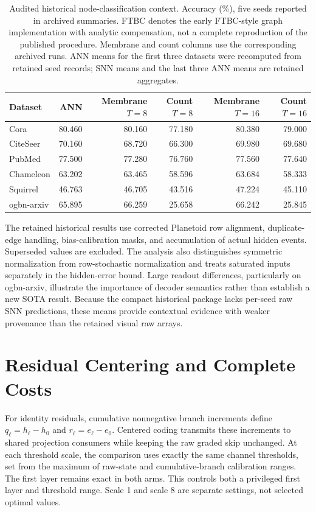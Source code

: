 \documentclass[10pt,twocolumn,letterpaper]{article}
\begin{document}
\begin{table}[t]\centering\small
\caption{Audited historical node-classification context. Accuracy (\%), five seeds reported in archived summaries. FTBC denotes the early FTBC-style graph implementation with analytic compensation, not a complete reproduction of the published procedure. Membrane and count columns use the corresponding archived runs. ANN means for the first three datasets were recomputed from retained seed records; SNN means and the last three ANN means are retained aggregates.}
\label{tab:nodes}
\begin{tabular}{lrrrrr}\toprule
Dataset & ANN & Membrane $T=8$ & Count $T=8$ & Membrane $T=16$ & Count $T=16$\\\midrule
Cora &80.460&80.160&77.180&80.380&79.000\\
CiteSeer &70.160&68.720&66.300&69.980&69.680\\
PubMed &77.500&77.280&76.760&77.560&77.640\\
Chameleon &63.202&63.465&58.596&63.684&58.333\\
Squirrel &46.763&46.705&43.516&47.224&45.110\\
ogbn-arxiv &65.895&66.259&25.658&66.242&25.845\\\bottomrule
\end{tabular}\end{table}

The retained historical results use corrected Planetoid row alignment, duplicate-edge handling, bias-calibration masks, and accumulation of actual hidden events. Superseded values are excluded. The analysis also distinguishes symmetric normalization from row-stochastic normalization and treats saturated inputs separately in the hidden-error bound. Large readout differences, particularly on ogbn-arxiv, illustrate the importance of decoder semantics rather than establish a new SOTA result. Because the compact historical package lacks per-seed raw SNN predictions, these means provide contextual evidence with weaker provenance than the retained visual raw arrays.

\section{Residual Centering and Complete Costs}
For identity residuals, cumulative nonnegative branch increments define $q_\ell=h_\ell-h_0$ and $r_\ell=e_\ell-e_0$. Centered coding transmits these increments to shared projection consumers while keeping the raw graded skip unchanged. At each threshold scale, the comparison uses exactly the same channel thresholds, set from the maximum of raw-state and cumulative-branch calibration ranges. The first layer remains exact in both arms. This controls both a privileged first layer and threshold range. Scale 1 and scale 8 are separate settings, not selected optimal values.
\end{document}
